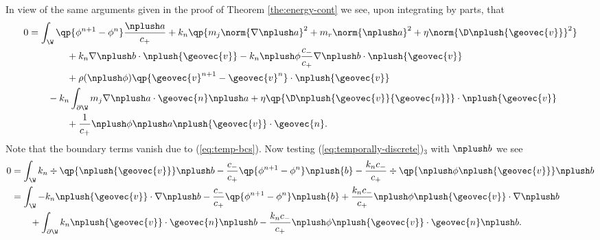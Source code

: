 \documentclass[final]{amsart}
\numberwithin{equation}{section}
\begin{document}
\begin{Proof}
  In view of the same arguments given in the proof of Theorem
  \ref{the:energy-cont} we see, upon integrating by parts, that
  \begin{equation}
    \label{eq:temp-energy-0}
    \begin{split}
      0 
      &=
      \int_\W
      \qp{\phi^{n+1}-\phi^n} \frac{\nplush a}{c_+}
      +
      k_n \qp{m_j\norm{\nabla \nplush a}^2
        +
        m_r \norm{\nplush a}^2
        +
        \eta \norm{\D \nplush{{\geovec{v}}}}^2}
      \\
      &\qquad\qquad
      +
      k_n \nabla \nplush b \cdot \nplush{{\geovec{v}}}
      -
      k_n \nplush \phi \frac{c_-}{c_+} \nabla \nplush b \cdot \nplush{{\geovec{v}}}
      \\
      &\qquad\qquad 
      +
      \rho(\nplush \phi) \qp{{\geovec{v}}^{n+1} - {\geovec{v}}^n} \cdot \nplush{{\geovec{v}}}
      \\
      &\qquad
      -
      k_n
      \int_{\partial \W} 
      m_j \nabla \nplush a \cdot {\geovec{n}} \nplush a
      +
      \eta \qp{\D \nplush{{\geovec{v}}} {\geovec{n}}} \cdot \nplush{{\geovec{v}}}
      \\
      &\qquad \qquad
      + \frac{1}{c_+} \nplush\phi \nplush a \nplush{{\geovec{v}}} \cdot {\geovec{n}}.
    \end{split}
  \end{equation}
  Note that the boundary terms vanish due to (\ref{eq:temp-bcs}). Now
  testing (\ref{eq:temporally-discrete})$_3$ with $\nplush b$ we see
  \begin{equation}
    \label{eq:temp-energy-1}
    \begin{split}
      0 
      &=
      \int_\W
      k_n \div\qp{\nplush{{\geovec{v}}}} \nplush b
      -
      \frac{c_-}{c_+}
      \qp{\phi^{n+1} - \phi^n}
      \nplush{b}
      -
      \frac{k_n c_-}{c_+}
      \div\qp{\nplush\phi \nplush{{\geovec{v}}}} \nplush b
      \\
      &=
      \int_\W 
      -
      k_n \nplush{{\geovec{v}}} \cdot \nabla \nplush b
      -
      \frac{c_-}{c_+}
      \qp{\phi^{n+1} - \phi^n}
      \nplush{b}
      +
      \frac{k_n c_-}{c_+}
      \nplush\phi \nplush{{\geovec{v}}} \cdot \nabla\nplush b
      \\
      &\qquad
      +
      \int_{\partial \W}
      k_n \nplush{{\geovec{v}}} \cdot {\geovec{n}} \nplush b
      -
      \frac{k_n c_-}{c_+}
      \nplush\phi \nplush{{\geovec{v}}} \cdot {\geovec{n}} \nplush b.
    \end{split}
  \end{equation}

\end{Proof}
\end{document}
